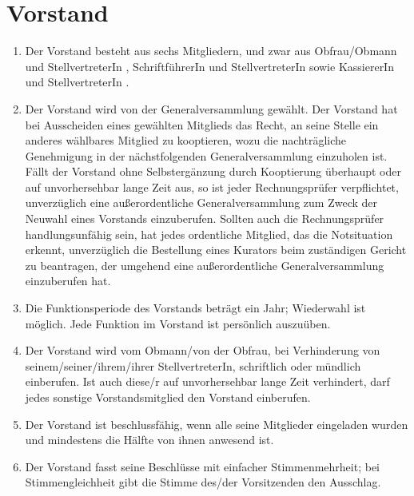 \documentclass[a4paper,12pt]{article}
\newcommand{\comment}[1]{{\bf /*Komm.:} \textit{#1} {\bf */}}
\def\comment#1{}
\newcommand{\obmann}{Obfrau/Obmann }
\newcommand{\secretary}{Schriftf\"uhrerIn }
\newcommand{\kassier}{KassiererIn }
\newcommand{\stv}{StellvertreterIn }
\newcommand{\stvk}{StellvertreterIn}
\newcommand{\dieser}{diese/r }
\begin{document}
\section{Vorstand} %
\begin{enumerate}

\item Der Vorstand besteht aus sechs Mitgliedern, und zwar aus \obmann und \stv, \secretary und \stv sowie \kassier und \stv.
\item Der Vorstand wird von der Generalversammlung gewählt.
Der Vorstand hat bei Ausscheiden eines gewählten Mitglieds das Recht, an seine Stelle ein anderes wählbares Mitglied zu kooptieren, wozu die nachträgliche Genehmigung in der nächstfolgenden Generalversammlung einzuholen ist.
Fällt der Vorstand ohne Selbstergänzung durch Kooptierung überhaupt oder auf unvorhersehbar lange Zeit aus, so ist jeder Rechnungsprüfer verpflichtet, unverzüglich eine außerordentliche Generalversammlung zum Zweck der Neuwahl eines Vorstands einzuberufen.
Sollten auch die Rechnungsprüfer handlungsunfähig sein, hat jedes ordentliche Mitglied, das die Notsituation erkennt, unverzüglich die Bestellung eines Kurators beim zuständigen Gericht zu beantragen, der umgehend eine außerordentliche Generalversammlung einzuberufen hat.

\item \label{item:funktionsperiode} Die Funktionsperiode des Vorstands beträgt ein Jahr; Wiederwahl ist möglich.
Jede Funktion im Vorstand ist persönlich auszuüben.

\item Der Vorstand wird vom Obmann/von der Obfrau, bei Verhinderung von seinem/seiner/ihrem/ihrer \stvk, schriftlich oder mündlich einberufen. Ist auch \dieser auf unvorhersehbar lange Zeit verhindert, darf jedes sonstige Vorstandsmitglied den Vorstand einberufen.
\comment{Das bezieht sich auf regelmässige Arbeits- und Beschluss-treffen, bei denen der Verein (micro)gemanaged wird}

\item Der Vorstand ist beschlussfähig, wenn alle seine Mitglieder eingeladen wurden und mindestens die Hälfte von ihnen anwesend ist.

\item Der Vorstand fasst seine Beschlüsse mit einfacher Stimmenmehrheit; bei Stimmengleichheit gibt die Stimme des/der Vorsitzenden den Ausschlag.

\comment{Entscheidungsfindung : Dieser (und letzter) Punkt: wie werden also day-to-day Entscheidungen getroffen }


\end{enumerate}
\end{document}

